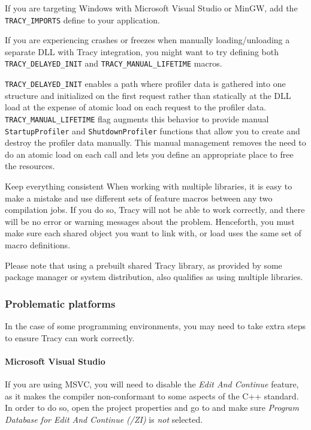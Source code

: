 \documentclass[hidelinks,titlepage,a4paper,twoside]{article}
\begin{document}
If you are targeting Windows with Microsoft Visual Studio or MinGW, add the \texttt{TRACY\_IMPORTS} define to your application.

If you are experiencing crashes or freezes when manually loading/unloading a separate DLL with Tracy integration, you might want to try defining both \texttt{TRACY\_DELAYED\_INIT} and \texttt{TRACY\_MANUAL\_LIFETIME} macros.

\texttt{TRACY\_DELAYED\_INIT} enables a path where profiler data is gathered into one structure and initialized on the first request rather than statically at the DLL load at the expense of atomic load on each request to the profiler data. \texttt{TRACY\_MANUAL\_LIFETIME} flag augments this behavior to provide manual \texttt{StartupProfiler} and \texttt{ShutdownProfiler} functions that allow you to create and destroy the profiler data manually. This manual management removes the need to do an atomic load on each call and lets you define an appropriate place to free the resources.

\begin{bclogo}[
noborder=true,
couleur=black!5,
logo=\bcbombe
]{Keep everything consistent}
When working with multiple libraries, it is easy to make a mistake and use different sets of feature macros between any two compilation jobs. If you do so, Tracy will not be able to work correctly, and there will be no error or warning messages about the problem. Henceforth, you must make sure each shared object you want to link with, or load uses the same set of macro definitions.

Please note that using a prebuilt shared Tracy library, as provided by some package manager or system distribution, also qualifies as using multiple libraries.
\end{bclogo}

\subsubsection{Problematic platforms}

In the case of some programming environments, you may need to take extra steps to ensure Tracy can work correctly.

\paragraph{Microsoft Visual Studio}

If you are using MSVC, you will need to disable the \emph{Edit And Continue} feature, as it makes the compiler non-conformant to some aspects of the C++ standard. In order to do so, open the project properties and go to  and make sure \emph{Program Database for Edit And Continue (/ZI)} is \emph{not} selected.
\end{document}
